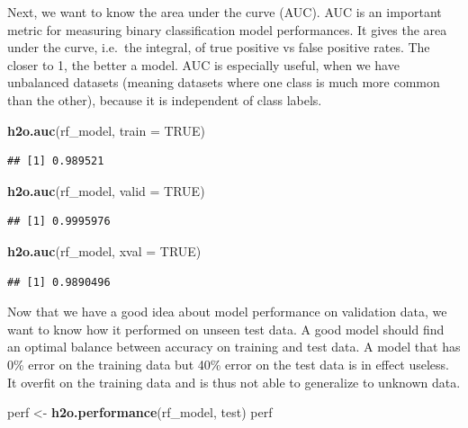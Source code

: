 \documentclass[]{article}
\newenvironment{Shaded}{\begin{snugshade}}{\end{snugshade}}
\newcommand{\KeywordTok}[1]{\textcolor[rgb]{0.13,0.29,0.53}{\textbf{{#1}}}}
\newcommand{\DataTypeTok}[1]{\textcolor[rgb]{0.13,0.29,0.53}{{#1}}}
\newcommand{\StringTok}[1]{\textcolor[rgb]{0.31,0.60,0.02}{{#1}}}
\newcommand{\OtherTok}[1]{\textcolor[rgb]{0.56,0.35,0.01}{{#1}}}
\newcommand{\NormalTok}[1]{{#1}}
\begin{document}
Next, we want to know the area under the curve (AUC). AUC is an
important metric for measuring binary classification model performances.
It gives the area under the curve, i.e.~the integral, of true positive
vs false positive rates. The closer to 1, the better a model. AUC is
especially useful, when we have unbalanced datasets (meaning datasets
where one class is much more common than the other), because it is
independent of class labels.

\begin{Shaded}
\begin{Highlighting}[]
\KeywordTok{h2o.auc}\NormalTok{(rf_model, }\DataTypeTok{train =} \OtherTok{TRUE}\NormalTok{)}
\end{Highlighting}
\end{Shaded}

\begin{verbatim}
## [1] 0.989521
\end{verbatim}

\begin{Shaded}
\begin{Highlighting}[]
\KeywordTok{h2o.auc}\NormalTok{(rf_model, }\DataTypeTok{valid =} \OtherTok{TRUE}\NormalTok{)}
\end{Highlighting}
\end{Shaded}

\begin{verbatim}
## [1] 0.9995976
\end{verbatim}

\begin{Shaded}
\begin{Highlighting}[]
\KeywordTok{h2o.auc}\NormalTok{(rf_model, }\DataTypeTok{xval =} \OtherTok{TRUE}\NormalTok{)}
\end{Highlighting}
\end{Shaded}

\begin{verbatim}
## [1] 0.9890496
\end{verbatim}

Now that we have a good idea about model performance on validation data,
we want to know how it performed on unseen test data. A good model
should find an optimal balance between accuracy on training and test
data. A model that has 0\% error on the training data but 40\% error on
the test data is in effect useless. It overfit on the training data and
is thus not able to generalize to unknown data.

\begin{Shaded}
\begin{Highlighting}[]
\NormalTok{perf <-}\StringTok{ }\KeywordTok{h2o.performance}\NormalTok{(rf_model, test)}
\NormalTok{perf}
\end{Highlighting}
\end{Shaded}
\end{document}
